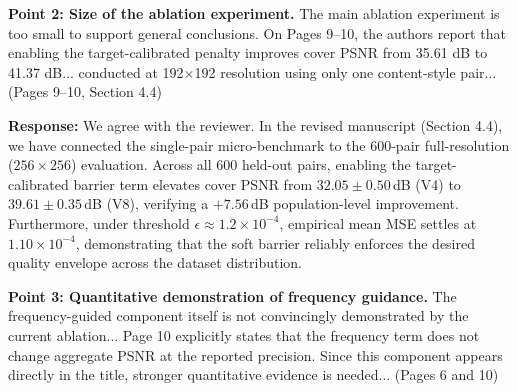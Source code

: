 \documentclass[11pt,a4paper]{article}
\begin{document}
\begin{revcomment}
\textbf{Point 2: Size of the ablation experiment.} The main ablation experiment is too small to support general conclusions. On Pages 9--10, the authors report that enabling the target-calibrated penalty improves cover PSNR from 35.61 dB to 41.37 dB... conducted at 192$\times$192 resolution using only one content-style pair... (Pages 9--10, Section 4.4)
\end{revcomment}

\noindent \textbf{Response:} We agree with the reviewer. In the revised manuscript (Section 4.4), we have connected the single-pair micro-benchmark to the 600-pair full-resolution ($256 \times 256$) evaluation. Across all 600 held-out pairs, enabling the target-calibrated barrier term elevates cover PSNR from $32.05 \pm 0.50$\,dB (V4) to $39.61 \pm 0.35$\,dB (V8), verifying a $+7.56$\,dB population-level improvement. Furthermore, under threshold $\epsilon \approx 1.2 \times 10^{-4}$, empirical mean MSE settles at $1.10 \times 10^{-4}$, demonstrating that the soft barrier reliably enforces the desired quality envelope across the dataset distribution.

\begin{revcomment}
\textbf{Point 3: Quantitative demonstration of frequency guidance.} The frequency-guided component itself is not convincingly demonstrated by the current ablation... Page 10 explicitly states that the frequency term does not change aggregate PSNR at the reported precision. Since this component appears directly in the title, stronger quantitative evidence is needed... (Pages 6 and 10)
\end{revcomment}
\end{document}

